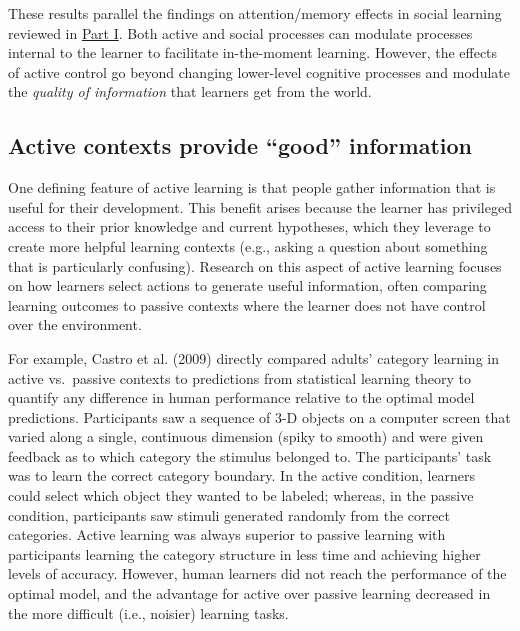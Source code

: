 \documentclass[oneside]{report}
\begin{document}
These results parallel the findings on attention/memory effects in
social learning reviewed in \protect\hyperlink{p1}{Part I}. Both active
and social processes can modulate processes internal to the learner to
facilitate in-the-moment learning. However, the effects of active
control go beyond changing lower-level cognitive processes and modulate
the \emph{quality of information} that learners get from the world.

\hypertarget{active-contexts-provide-good-information}{%
\subsection{Active contexts provide ``good''
information}\label{active-contexts-provide-good-information}}

One defining feature of active learning is that people gather
information that is useful for their development. This benefit arises
because the learner has privileged access to their prior knowledge and
current hypotheses, which they leverage to create more helpful learning
contexts (e.g., asking a question about something that is particularly
confusing). Research on this aspect of active learning focuses on how
learners select actions to generate useful information, often comparing
learning outcomes to passive contexts where the learner does not have
control over the environment.

For example, Castro et al. (2009) directly compared adults' category
learning in active vs.~passive contexts to predictions from statistical
learning theory to quantify any difference in human performance relative
to the optimal model predictions. Participants saw a sequence of 3-D
objects on a computer screen that varied along a single, continuous
dimension (spiky to smooth) and were given feedback as to which category
the stimulus belonged to. The participants' task was to learn the
correct category boundary. In the active condition, learners could
select which object they wanted to be labeled; whereas, in the passive
condition, participants saw stimuli generated randomly from the correct
categories. Active learning was always superior to passive learning with
participants learning the category structure in less time and achieving
higher levels of accuracy. However, human learners did not reach the
performance of the optimal model, and the advantage for active over
passive learning decreased in the more difficult (i.e., noisier)
learning tasks.
\end{document}
